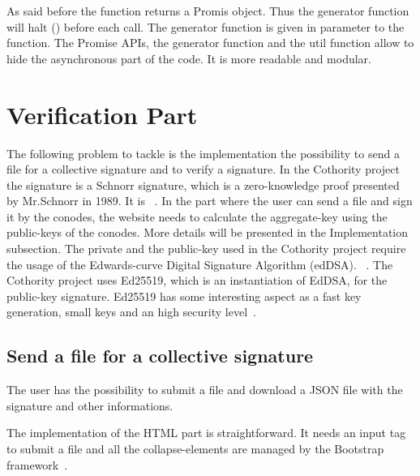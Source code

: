 \documentclass[11pt, a4paper, twoside, openright, openany]{book} %
\begin{document}
As said before the  function returns a Promis object.
Thus the generator function  will halt () before each
 call.
\newline
The generator function is given in parameter to the  function.
\newline
The Promise APIs, the generator function and the util function  allow
to hide the asynchronous part of the code. It is more readable and modular.
\bigbreak


\section{Verification Part}
The following problem to tackle is the implementation the possibility to send a
file for a collective signature and to verify a signature.
\newline
In the Cothority project the signature is a Schnorr signature, which is a zero-knowledge proof presented
by Mr.Schnorr in 1989. It is ~\cite{wikiSchnorr}.
\newline
In the part where the user can send a file and sign it by the conodes,
the website needs to calculate the aggregate-key using the public-keys of the conodes.
More details will be presented in the Implementation subsection.
\newline
The private and the public-key used in the Cothority project require the usage of
the Edwards-curve Digital Signature Algorithm (edDSA).
~\cite{edDSA}.
The Cothority project uses Ed25519, which is an instantiation of EdDSA, for the
public-key signature. Ed25519 has some interesting aspect as a fast key generation,
small keys and an high security level~\cite{ed25519}.
\bigbreak

\subsection{Send a file for a collective signature}
The user has the possibility to submit a file and download a JSON file with the
signature and other informations.
\bigbreak

The implementation of the HTML part is straightforward. It needs an input tag to
submit a file and all the collapse-elements are managed by the Bootstrap framework~\cite{bootstrap}.
\bigbreak
\end{document}
